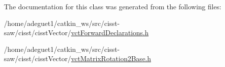 The documentation for this class was generated from the following files\-:\begin{DoxyCompactItemize}
\item 
/home/adeguet1/catkin\-\_\-ws/src/cisst-\/saw/cisst/cisst\-Vector/\hyperlink{vct_forward_declarations_8h}{vct\-Forward\-Declarations.\-h}\item 
/home/adeguet1/catkin\-\_\-ws/src/cisst-\/saw/cisst/cisst\-Vector/\hyperlink{vct_matrix_rotation2_base_8h}{vct\-Matrix\-Rotation2\-Base.\-h}\end{DoxyCompactItemize}
